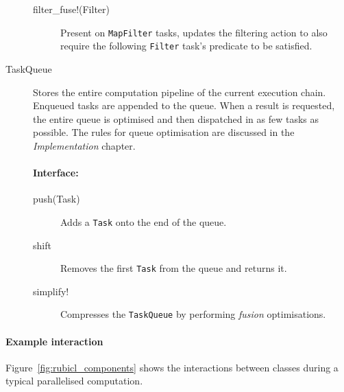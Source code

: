 \begin{description}
\begin{description}
  \item[filter\_fuse!(Filter)] Present on \verb|MapFilter| tasks, updates the filtering action to also require the following \verb|Filter| task's predicate to be satisfied.
\end{description}

\item[TaskQueue]
Stores the entire computation pipeline of the current execution chain. Enqueued tasks are appended to the queue. When a result is requested, the entire queue is optimised and then dispatched in as few tasks as possible. The rules for queue optimisation are discussed in the \emph{Implementation} chapter.

\paragraph*{Interface:}
\begin{description}
  \item[push(Task)] Adds a \verb|Task| onto the end of the queue.

\item[shift] Removes the first \verb|Task| from the queue and returns it.

\item[simplify!] Compresses the \verb|TaskQueue| by performing \emph{fusion} optimisations.
\end{description}


\end{description}


\paragraph*{Example interaction} Figure~\ref{fig:rubicl_components} shows the interactions between classes during a typical parallelised computation.

